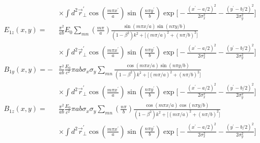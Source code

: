 \documentclass[11pt,oneside]{article}
\begin{document}
\begin{equation}
\begin{split}
  & \times
    \int d^{2} \vec{r}_{\perp}^{\prime}
    \cos \left( \frac{ m \pi x^{\prime} }{ a } \right)
    \sin \left( \frac{ n \pi y^{\prime} }{ b } \right)
    \exp \Bigg[
       - \frac{ \left( x^{\prime} - a/2 \right)^{2} }{ 2\sigma_{x}^{2}}
       - \frac{ \left( y^{\prime} - b/2 \right)^{2} }{ 2\sigma_{y}^{2}}
         \Bigg] \\
  E_{1z} (x,y)
=
  & \frac{\pi^{2}}{ab} E_{0}
    \sum_{mn} 
    \left( \frac{m \pi}{a} \right) 
    \frac{ \sin \left( m \pi x /a \right) \sin \left( n \pi y /b \right) }
         { \left( 1 - \beta^{2} \right) k^{2}
         + \Big[
           \left( m \pi /a \right)^{2} + \left( n \pi /b \right)^{2}
           \Big] } \\
  & \times
    \int d^{2} \vec{r}_{\perp}^{\prime}
    \cos \left( \frac{ m \pi x^{\prime} }{ a } \right)
    \sin \left( \frac{ n \pi y^{\prime} }{ b } \right)
    \exp \Bigg[
       - \frac{ \left( x^{\prime} - a/2 \right)^{2} }{ 2\sigma_{x}^{2}}
       - \frac{ \left( y^{\prime} - b/2 \right)^{2} }{ 2\sigma_{y}^{2}}
         \Bigg] \\
  B_{1y} (x,y)
=
- & \frac{\pi^{2}}{ab} \frac{E_{0}}{c^{2}}
         {\pi a b \sigma_{x} \sigma_{y}}
    \sum_{mn}
    \frac{ \cos \left( m \pi x /a \right) \sin \left( n \pi y /b \right) }
         { \left( 1 - \beta^{2} \right) k^{2}
         + \Big[
           \left( m \pi /a \right)^{2} + \left( n \pi /b \right)^{2}
           \Big] } \\
  & \times
    \int d^{2} \vec{r}_{\perp}^{\prime}
    \cos \left( \frac{ m \pi x^{\prime} }{ a } \right)
    \sin \left( \frac{ n \pi y^{\prime} }{ b } \right)
    \exp \Bigg[
       - \frac{ \left( x^{\prime} - a/2 \right)^{2} }{ 2\sigma_{x}^{2}}
       - \frac{ \left( y^{\prime} - b/2 \right)^{2} }{ 2\sigma_{y}^{2}}
         \Bigg] \\
  B_{1z} (x,y)
=
  & \frac{\pi^{2}}{ab} \frac{E_{0}}{c^{2}}
         {\pi a b \sigma_{x} \sigma_{y}}
    \sum_{mn} \left( \frac{n \pi}{b} \right)
    \frac{\cos \left( m \pi x /a \right) \cos \left( n \pi y /b \right) }
         { \left( 1 - \beta^{2} \right) k^{2}
         + \Big[
           \left( m \pi /a \right)^{2} + \left( n \pi /b \right)^{2}
           \Big] } \\
  & \times
    \int d^{2} \vec{r}_{\perp}^{\prime}
    \cos \left( \frac{ m \pi x^{\prime} }{ a } \right)
    \sin \left( \frac{ n \pi y^{\prime} }{ b } \right)
    \exp \Bigg[
       - \frac{ \left( x^{\prime} - a/2 \right)^{2} }{ 2\sigma_{x}^{2}}
       - \frac{ \left( y^{\prime} - b/2 \right)^{2} }{ 2\sigma_{y}^{2}}
         \Bigg] \\
\end{split}
\end{equation}
\end{document}
